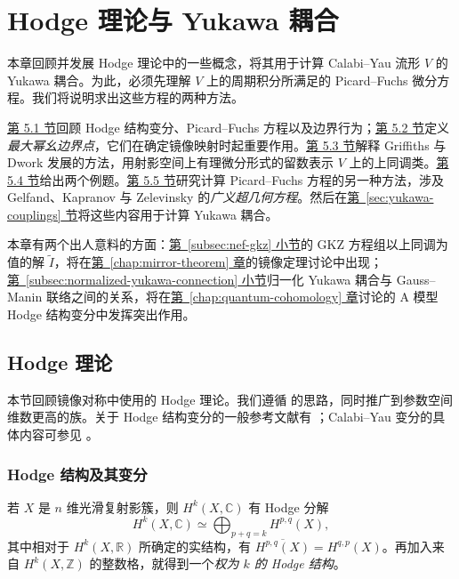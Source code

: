\chapter{Hodge 理论与 Yukawa 耦合}\label{chap:hodge-yukawa}

本章回顾并发展 Hodge 理论中的一些概念，将其用于计算 Calabi--Yau 流形 $V$ 的 Yukawa 耦合。为此，必须先理解 $V$ 上的周期积分所满足的 Picard--Fuchs 微分方程。我们将说明求出这些方程的两种方法。

\hyperref[sec:hodge-theory]{第 5.1 节}回顾 Hodge 结构变分、Picard--Fuchs 方程以及边界行为；\hyperref[sec:maximal-unipotent]{第 5.2 节}定义\emph{最大幂幺边界点}，它们在确定镜像映射时起重要作用。\hyperref[sec:griffiths-dwork]{第 5.3 节}解释 Griffiths 与 Dwork 发展的方法，用射影空间上有理微分形式的留数表示 $V$ 上的上同调类。\hyperref[sec:hodge-examples]{第 5.4 节}给出两个例题。\hyperref[sec:hypergeometric]{第 5.5 节}研究计算 Picard--Fuchs 方程的另一种方法，涉及 Gelfand、Kapranov 与 Zelevinsky 的\emph{广义超几何方程}。然后在\hyperref[sec:yukawa-couplings]{第~\ref*{sec:yukawa-couplings} 节}将这些内容用于计算 Yukawa 耦合。

本章有两个出人意料的方面：\hyperref[subsec:nef-gkz]{第~\ref*{subsec:nef-gkz} 小节}的 GKZ 方程组以上同调为值的解 $\widetilde I$，将在\hyperref[chap:mirror-theorem]{第~\ref*{chap:mirror-theorem} 章}的镜像定理讨论中出现；\hyperref[subsec:normalized-yukawa-connection]{第~\ref*{subsec:normalized-yukawa-connection} 小节}归一化 Yukawa 耦合与 Gauss--Manin 联络之间的关系，将在\hyperref[chap:quantum-cohomology]{第~\ref*{chap:quantum-cohomology} 章}讨论的 A 模型 Hodge 结构变分中发挥突出作用。

\section{Hodge 理论}\label{sec:hodge-theory}

本节回顾镜像对称中使用的 Hodge 理论。我们遵循  的思路，同时推广到参数空间维数更高的族。关于 Hodge 结构变分的一般参考文献有 ；Calabi--Yau 变分的具体内容可参见 。

\subsection{Hodge 结构及其变分}\label{subsec:hodge-variations}

若 $X$ 是 $n$ 维光滑复射影簇，则 $H^k(X,\mathbb C)$ 有 Hodge 分解
\[
H^k(X,\mathbb C)\simeq\bigoplus_{p+q=k}H^{p,q}(X),
\]
其中相对于 $H^k(X,\mathbb R)$ 所确定的实结构，有 $\overline{H^{p,q}(X)}=H^{q,p}(X)$。再加入来自 $H^k(X,\mathbb Z)$ 的整数格，就得到一个\emph{权为 $k$ 的 Hodge 结构}。

